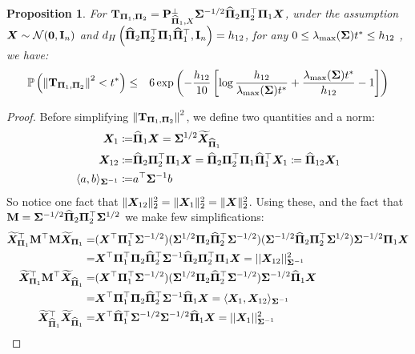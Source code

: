 \documentclass[numsec,webpdf,modern,medium,namedate]{oup-authoring-template}
\theoremstyle{thmstyleone}%
\newtheorem{proposition}{Proposition}
\theoremstyle{thmstyletwo}%
\theoremstyle{thmstylethree}%
\begin{document}
\begin{proposition}\label{prop:prob-T-less-t}
    For $\bT_{\bPi_1, \bPi_2} = \bP_{\hatPi_1, X}^\perp {\bSig}^{-1/2} \hatPi_2 \bPi_2^\top \bPi_1 \bX$, under the assumption $\bX \sim \calN(\bzero,\bI_n)$ and $d_H\left(\hatPi_2\bPi_2^\top\bPi_1 \hatPi_1^\top,\bI_n\right) = h_{12}$, for any $0 \leq  \lambda_{\max}(\bSig) t^\ast \leq h_{12}$ , we have:
    \begin{eqnarray}\label{eq:prob-T-less-t}
        \mathbb{P}\left(\left\|\mathbf{T}_{\boldsymbol{\Pi}_1, \boldsymbol{\Pi}_2} \right\|^2 < t^\ast\right) 
        & \leq &  6 \exp\left(-\frac{h_{12}}{10}\left[\log \frac{h_{12}}{\lambda_{\max}(\boldsymbol{\Sigma})t^\ast} + \dfrac{\lambda_{\max}(\boldsymbol{\Sigma})t^\ast}{h_{12}} -1\right]\right)
    \end{eqnarray}
\end{proposition}
\begin{proof}
Before simplifying $\left\|\bT_{\bPi_1, \bPi_2} \right\|^2$, we define two quantities and a norm:
$$
\begin{aligned}
    \bX_{1}\coloneqq & \hatPi_1\bX = {\bSig}^{1/2}\tilX_{\hatPi_1}\\
 \bX_{12}\coloneqq&\hatPi_2\bPi_2^\top\bPi_1\bX =\hatPi_2\bPi_2^\top\bPi_1 \hatPi_1^\top\bX_{1} \coloneqq \hatPi_{12}\bX_1\\
    \langle a,b\rangle_{\Siginv} \coloneqq& a^\top\Siginv b
\end{aligned}
$$
So notice one fact that $\|\bX_{12}\|^2_2 = \|\bX_1\|^2_2 = \|\bX\|^2_2$.
Using these, and the fact that $\bM = {\bSig}^{-1/2} \hatPi_2 \bPi_2^\top {\bSig}^{1/2}$ we make few simplifications:
$$
\begin{aligned}
    \tilX^\top_{\bPi_1}\bM^\top \bM\tilX_{\bPi_1} 
    = & (\bX^\top\bPi_1^\top{\bSig}^{-1/2})({\bSig}^{1/2} \bPi_2 \hatPi_2^\top{\bSig}^{-1/2}) ({\bSig}^{-1/2} \hatPi_2\bPi_2^\top{\bSig}^{1/2}){\bSig}^{-1/2}\bPi_1\bX\\
    = & \bX^\top\bPi_1^\top\bPi_2 \hatPi_2^\top\Siginv \hatPi_2\bPi_2^\top\bPi_1\bX
    =  ||\bX_{12}||^2_{\Siginv}\\
    \tilX_{\bPi_1}^\top \bM^\top\tilX_{\hatPi_1}
    = & (\bX^\top\bPi_1^\top{\bSig}^{-1/2})({\bSig}^{1/2} \bPi_2 \hatPi_2^\top{\bSig}^{-1/2}){\bSig}^{-1/2}\hatPi_1\bX\\
    = & \bX^\top\bPi_1^\top\bPi_2 \hatPi_2^\top\Siginv\hatPi_1\bX
    = \langle \bX_{1}, \bX_{12}\rangle_{\Siginv}\\
    \tilX_{\hatPi_1}^\top\tilX_{\hatPi_1}
    = & \bX^\top\hatPi_1^\top{\bSig}^{-1/2}{\bSig}^{-1/2}\hatPi_1\bX =  ||\bX_1||^2_{\Siginv}

\end{aligned}$$
\end{proof}
\end{document}
